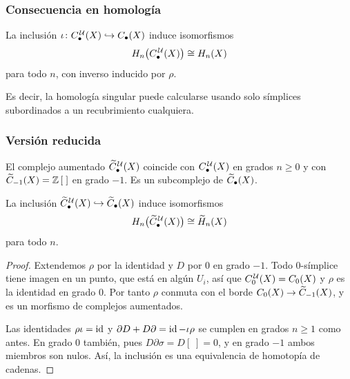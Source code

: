 \begin{frame}
  \frametitle{Consecuencia en homología}

  \begin{corollary}
    La inclusión $\iota\colon C^{\mkern2mu\mathcal{U}}_\bullet(X)\hookrightarrow C_\bullet(X)$
    induce isomorfismos
    \[
      H_n\bigl(C^{\mkern2mu\mathcal{U}}_\bullet(X)\bigr)\cong H_n(X)
    \]
    para todo $n$, con inverso inducido por $\rho$.
  \end{corollary}

  \medskip

  Es decir, la homología singular puede calcularse usando solo símplices
  subordinados a un recubrimiento cualquiera.
\end{frame}

\begin{frame}[allowframebreaks]
  \frametitle{Versión reducida}

  El complejo aumentado $\widetilde{C}^{\mkern2mu\mathcal{U}}_\bullet(X)$ coincide con $C^{\mkern2mu\mathcal{U}}_\bullet(X)$
  en grados $n\geq0$ y con $\widetilde{C}_{-1}(X)=\mathbb{Z}\,[\;]$ en grado
  $-1$. Es un subcomplejo de $\widetilde{C}_\bullet(X)$.

  \begin{corollary}
    La inclusión $\widetilde{C}^{\mkern2mu\mathcal{U}}_\bullet(X)\hookrightarrow\widetilde{C}_\bullet(X)$
    induce isomorfismos
    \[
      H_n\bigl(\widetilde{C}^{\mkern2mu\mathcal{U}}_\bullet(X)\bigr)\cong\widetilde{H}_n(X)
    \]
    para todo $n$.
  \end{corollary}

  \framebreak

  \begin{proof}
    Extendemos $\rho$ por la identidad y $D$ por $0$ en grado $-1$. Todo
    $0$-símplice tiene imagen en un punto, que está en algún $U_i$, así que
    $C^{\mkern2mu\mathcal{U}}_0(X)=C_0(X)$ y $\rho$ es la identidad en grado $0$. Por tanto
    $\rho$ conmuta con el borde $C_0(X)\to\widetilde{C}_{-1}(X)$, y
    es un morfismo de complejos aumentados.

    \medskip

    Las identidades $\rho\iota=\operatorname{id}$ y $\partial D+D\partial=\operatorname{id}-\iota\rho$
    se cumplen en grados $n\geq1$ como antes. En grado $0$ también, pues
    $D\partial\sigma=D[\;]=0$, y en grado $-1$ ambos miembros son nulos.
    Así, la inclusión es una equivalencia de homotopía de cadenas.
  \end{proof}
\end{frame}

